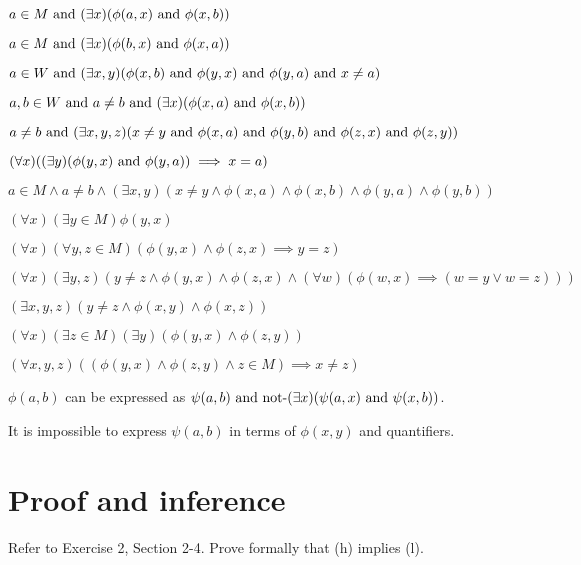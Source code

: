 \begin{solution}
\begin{enumalpha}
    \item $a\in M\land (\exists x)\prn{\phi(a,x)\land \phi(x, b)}$
    \item $a\in M\land (\exists x)\prn{\phi(b,x)\land \phi(x, a)}$
    \item $a\in W\land (\exists x, y)\prn{\phi(x,b)\land \phi(y, x)\land \phi(y,a)\land x\neq a}$
    \item $a,b\in W\land a\neq b\land (\exists x)\prn{\phi(x, a)\land \phi(x, b)}$
    \item $a\neq b\land (\exists x, y, z)\prn{x\neq y\land \phi(x,a)\land \phi(y,b)\land \phi(z, x)\land \phi(z,y)}$
    \item $(\forall x)\prn{(\exists y)(\phi(y,x)\land \phi(y, a))\implies x = a}$
    \item $a\in M\land a\neq b\land (\exists x,y)(x\neq y\land \phi(x,a)\land \phi(x,b)\land \phi(y,a)\land \phi(y,b))$
    \item $(\forall x)(\exists y\in M)\phi(y, x)$
    \item $(\forall x)(\forall y,z\in M)(\phi(y, x)\land \phi(z,x) \implies y = z)$
    \item $(\forall x)(\exists y,z)(y\neq z\land \phi(y, x)\land \phi(z,x)
    \land (\forall w)(\phi(w,x)\implies (w=y\lor w=z)))$
    \item $(\exists x,y,z)(y\neq z\land \phi(x,y)\land \phi(x,z))$
    \item $(\forall x)(\exists z\in M)(\exists y)(\phi(y, x)\land \phi(z,y))$
    \item $(\forall x,y,z)((\phi(y, x)\land \phi(z,y)\land z\in M) \implies x\neq z)$
\end{enumalpha}

$\phi(a,b)$ can be expressed as $\psi(a,b)\text{ and } \text{not-}(\exists x)(\psi(a,x)\text{ and } \psi(x,b))$.

It is impossible to express $\psi(a, b)$ in terms of $\phi(x, y)$ and quantifiers.
\end{solution}


\section{Proof and inference}

\begin{exercise}
Refer to Exercise 2, Section 2-4. Prove formally that (h) implies (l).
\end{exercise}

